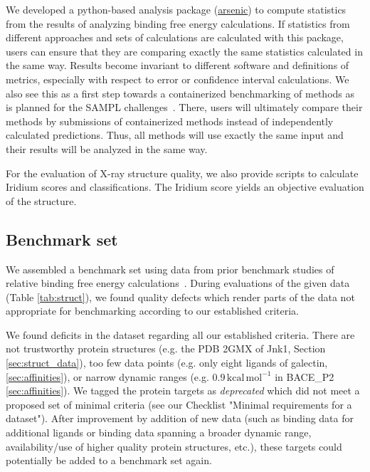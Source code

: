 \documentclass[9pt,bestpractices,pubversion]{livecoms}
\begin{document}
We developed a python-based analysis package (\href{http://github.com/OpenFreeEnergy/arsenic}{arsenic}) to compute statistics from the results of analyzing binding free energy calculations. If statistics from different approaches and sets of calculations are calculated with this package, users can ensure that they are comparing exactly the same statistics calculated in the same way. Results become invariant to different software and definitions of metrics, especially with respect to error or confidence interval calculations. We also see this as a first step towards a containerized benchmarking of methods as is planned for the SAMPL challenges~\cite{mobley_sampl_2021}. There, users will ultimately compare their methods by submissions of containerized methods instead of independently calculated predictions. Thus, all methods will use exactly the same input and their results will be analyzed in the same way. 

For the evaluation of X-ray structure quality, we also provide scripts to calculate Iridium scores and classifications. The Iridium score yields an objective evaluation of the structure.

\subsection{Benchmark set}
\label{sec:benchmark_set}

We assembled a benchmark set using data from prior benchmark studies of relative binding free energy calculations~\cite{wang_accurate_2015,gapsys_large_2020,schindler_largescale_2020}. During evaluations of the given data (Table \ref{tab:struct}), we found quality defects which render parts of the data not appropriate for benchmarking according to our established criteria.

We found deficits in the dataset regarding all our established criteria. There are not trustworthy protein structures (e.g. the PDB 2GMX of Jnk1, Section \ref{sec:struct_data}),
too few data points (e.g. only eight ligands of galectin, \ref{sec:affinities}), or
narrow dynamic ranges (e.g. $0.9\,\mathrm{kcal\,mol^{-1}}$ in BACE\_P2 \ref{sec:affinities}).
% 
We tagged the protein targets as \textit{deprecated} which did not meet a proposed set of minimal criteria (see our Checklist "Minimal requirements for a dataset"). After improvement by addition of new data (such as binding data for additional ligands or binding data spanning a broader dynamic range, availability/use of higher quality protein structures, etc.), these targets could potentially be added to a benchmark set again. 
\end{document}
